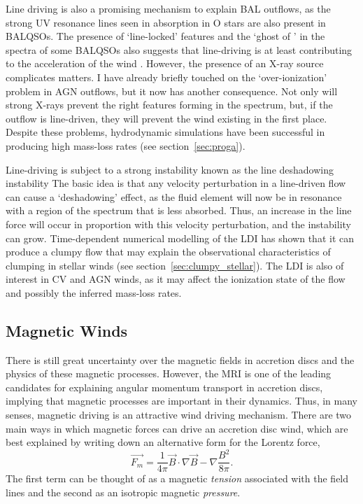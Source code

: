 Line driving is also a promising mechanism to explain BAL outflows, as
the strong UV resonance lines seen in absorption in O stars are also 
present in BALQSOs. The presence of `line-locked' features \citep{bowler2014} 
and the `ghost of \la' \citep{arav1995, arav1996, north2006}
in the spectra of some BALQSOs also suggests that line-driving is
at least contributing to the acceleration of the wind 
\citep[but see also][]{cottis2010}.
However, the presence of an X-ray source complicates matters.
I have already briefly touched on the `over-ionization' problem
in AGN outflows, but it now has another consequence. Not only will 
strong X-rays prevent the right features forming in the spectrum, but, if
the outflow is line-driven, they will prevent the wind existing in the first 
place. Despite these problems, hydrodynamic simulations have been successful 
in producing high mass-loss rates (see section~\ref{sec:proga}).

Line-driving is subject to a strong instability known
as the line deshadowing instability 
\citep[LDI;][]{lucysolomon1970,macgregor1979,owockirybicki1984,owockirybicki1985}
The basic idea is that any velocity perturbation in a line-driven flow can cause a 
`deshadowing' effect, as the fluid element will now
be in resonance with a region of the spectrum that is less absorbed.
Thus, an increase in the line force will occur in proportion
with this velocity perturbation, and the instability can grow. 
Time-dependent numerical modelling of the LDI has shown that it can
produce a clumpy flow \citep{owocki1988,feldmeier1995,surlan2012,owocki2014}
that may explain the observational characteristics of clumping in 
stellar winds (see section~\ref{sec:clumpy_stellar}). 
The LDI is also of interest in CV and AGN winds, as it
may affect the ionization state of the flow and possibly the inferred
mass-loss rates.


\subsection{Magnetic Winds}
\label{sec:mag_winds}

There is still great uncertainty over the magnetic fields in accretion discs
and the physics of these magnetic processes. However, the MRI is one of the 
leading candidates for explaining angular momentum transport in accretion discs,
implying that magnetic processes are important in their dynamics. 
Thus, in many senses, magnetic driving is an attractive wind driving mechanism.
There are two main ways in which magnetic forces can drive an 
accretion disc wind, which are best explained by writing down an 
alternative form for the Lorentz force,
\begin{equation}
\vec{F_m} = \frac{1}{4\pi} \vec{B} \cdot \nabla \vec{B} - \nabla \frac{B^2}{8\pi}.
\end{equation}
The first term can be thought of as a magnetic {\em tension}
associated with the field lines and the second as an isotropic magnetic
{\em pressure}.

